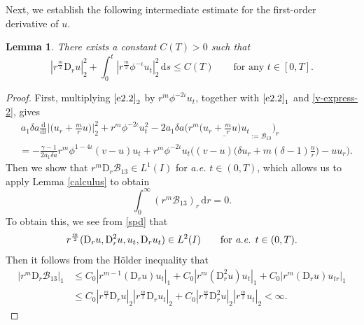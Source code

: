 \documentclass[11pt,reqno]{amsart}
\newtheorem{lem}{Lemma}[section]
\numberwithin{rk}{section}
\numberwithin{prop}{section}
\numberwithin{mydef}{section}
\numberwithin{lem}{section}
\numberwithin{equation}{section}
\numberwithin{thm}{section}
\begin{document}
Next, we establish the following intermediate estimate for the first-order derivative of $u$.
\begin{lem}\label{l4.6-0}
There exists a constant $C(T)>0$ such that 
\begin{equation*} 
|r^\frac{m}{2} \mathrm{D}_r u|_2^2+\int_0^t |r^{\frac{m}{2}}\phi^{-\iota}u_t|_2^2\,\mathrm{d}s\leq C(T)\qquad\text{for any $t\in [0,T]$}.
\end{equation*}
\end{lem}
\begin{proof}
First, multiplying $\eqref{e2.2}_2$ by $r^m \phi^{-2\iota}u_t$, together with $\eqref{e2.2}_1$ and \eqref{v-express-2}, gives 
\begin{equation}\label{7.5-1}
\begin{aligned}
&\,a_1\delta a\frac{\mathrm{d}}{\mathrm{d}t}\Big|\big(u_r+\frac{m}{r}u\big)\Big|_2^2+r^m\phi^{-2\iota}u_t^2-2a_1\delta a \Big(r^m\underline{\big(u_r+\frac{m}{r}u\big)u_t}_{:=\mathcal{B}_{13}}\Big)_r\\
&= -\frac{\gamma-1}{2a_1\delta a}r^m\phi^{1-4\iota}(v-u)u_t+r^m\phi^{-2\iota} u_t\Big( (v-u)\big(\delta u_r+m(\delta-1)\frac{u}{r}\big) -  uu_r\Big).
\end{aligned}
\end{equation}
Then we show that $r^m \mathrm{D}_r\mathcal{B}_{13} \in L^1(I)$ for \textit{a.e.} $t\in (0,T)$, which allows us to apply Lemma \ref{calculus} to obtain 
\begin{equation}\label{int-B13}
\int_0^\infty (r^m\mathcal{B}_{13})_r\,\mathrm{d}r=0.
\end{equation}
To obtain this, we see from \eqref{spd} that
\begin{equation*}
r^\frac{m}{2} (\mathrm{D}_r u,\mathrm{D}_r^2 u,u_t,\mathrm{D}_r u_t)\in L^2(I)\qquad\text{for \textit{a.e.} $t\in (0,T)$}.
\end{equation*}
Then it follows from the H\"older inequality that
\begin{equation*}
\begin{aligned}
|r^m \mathrm{D}_r\mathcal{B}_{13}|_1&\leq C_0|r^{m-1}(\mathrm{D}_r u) u_t|_1+C_0 |r^{m}(\mathrm{D}_r^2 u)u_t|_1+C_0|r^{m}(\mathrm{D}_r u)u_{tr}|_1\\
&\leq C_0 |r^\frac{m}{2} \mathrm{D}_r u|_2|r^\frac{m}{2}\mathrm{D}_r u_t|_2+C_0 |r^\frac{m}{2}\mathrm{D}_r^2 u|_2|r^\frac{m}{2}u_t|_2<\infty.
\end{aligned}
\end{equation*}


\end{proof}
\end{document}
